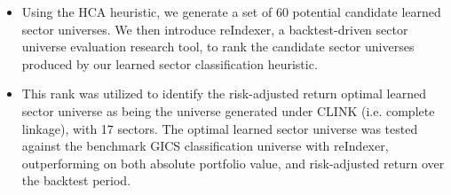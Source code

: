 \documentclass[10pt]{article}
\newcommand{\tabularxwidth}{\textwidth}
\begin{document}
\begin{minipage}{\tabularxwidth}
\begin{itemize}[noitemsep, topsep=3pt, parsep=0pt, partopsep=0pt]
                \item 
    Using the HCA heuristic, we generate a set of 60 potential candidate learned sector universes. We then introduce reIndexer, a backtest-driven sector universe evaluation research tool, to rank the candidate sector universes produced by our learned sector classification heuristic.
            
                \item 
    This rank was utilized to identify the risk-adjusted return optimal learned sector universe as being the universe generated under CLINK (i.e. complete linkage), with 17 sectors. The optimal learned sector universe was tested against the benchmark GICS classification universe with reIndexer, outperforming on both absolute portfolio value, and risk-adjusted return over the backtest period.
            
        \end{itemize}

        
            \vspace{.5em}
        

        \end{minipage}
    
\end{document}
